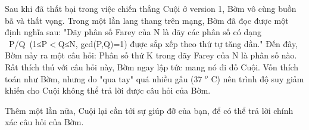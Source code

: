 Sau khi đã thất bại trong việc chiến thắng Cuội ở version 1, Bờm vô cùng buồn bã và thất vọng. Trong một lần lang thang trên mạng, Bờm đã đọc được một định nghĩa sau: "Dãy phân số Farey của N là dãy các phân số có dạng  P/Q (1≤P$<$Q≤N, gcd(P,Q)=1) được sắp xếp theo thứ tự tăng dần." Đến đây, Bờm nảy ra một câu hỏi: Phân số thứ K trong dãy Farey của N là phân số nào.  Rất thích thú với câu hỏi này, Bờm ngay lập tức mang nó đi đố Cuội. Vốn thích toán như Bờm, nhưng do "qua tay" quá nhiều gấu (37   $^    o   $   C) nên trình độ suy giảm khiến cho Cuội không thể trả lời được câu hỏi của Bờm.  

   Thêm một lần nữa, Cuội lại cần tới sự giúp đỡ của bạn, để có thể trả lời chính xác câu hỏi của Bờm.